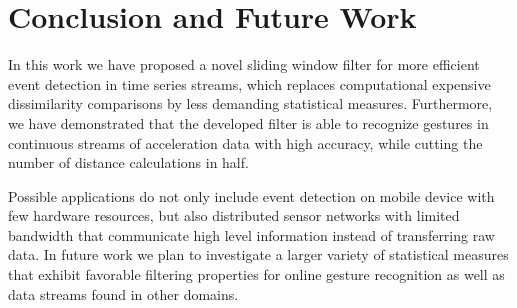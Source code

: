 \section{Conclusion and Future Work} \label{conclusion_and_future_work}

In this work we have proposed a novel sliding window filter for more efficient event detection in time series streams, which replaces computational expensive dissimilarity comparisons by less demanding statistical measures. Furthermore, we have demonstrated that the developed filter is able to recognize gestures in continuous streams of acceleration data with high accuracy, while cutting the number of distance calculations in half. 

Possible applications do not only include event detection on mobile device with few hardware resources, but also distributed sensor networks with limited bandwidth that communicate high level information instead of transferring raw data. In future work we plan to investigate a larger variety of statistical measures that exhibit favorable filtering properties for online gesture recognition as well as data streams found in other domains.





